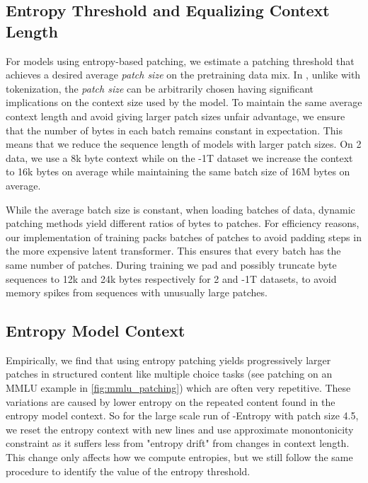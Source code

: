 \documentclass[]{fairmeta}
\begin{document}
\subsection{Entropy Threshold and Equalizing Context Length}
For models using entropy-based patching, we estimate a patching threshold that achieves a desired average \textit{patch size} on the pretraining data mix.  In \model{}, unlike with tokenization, the \textit{patch size} can be arbitrarily chosen having significant implications on the context size used by the model.
To maintain the same average context length and avoid giving larger patch sizes unfair advantage, we ensure that the number of bytes in each batch remains constant in expectation. This means that we reduce the sequence length of models with larger patch sizes. On \llama{} 2 data, we use a 8k byte context while on the \model{}-1T dataset we increase the context to 16k bytes on average while maintaining the same batch size of 16M bytes on average.

While the average batch size is constant, when loading batches of data, dynamic patching methods yield different ratios of bytes to patches.
For efficiency reasons, our implementation of \model{} training packs batches of patches to avoid padding steps in the more expensive latent transformer. This ensures that every batch has the same number of patches. During training we pad and possibly truncate byte sequences to 12k and 24k bytes respectively for \llama{} 2 and \model{}-1T datasets, to avoid memory spikes from sequences with unusually large patches.

\subsection{Entropy Model Context}
\label{section:entropy-context}
Empirically, we find that using entropy patching yields progressively larger patches in structured content like multiple choice tasks (see patching on an MMLU example in \autoref{fig:mmlu_patching}) which are often very repetitive. These variations are caused by lower entropy on the repeated content found in the entropy model context. So for the large scale run of \model{}-Entropy with patch size 4.5, we reset the entropy context with new lines and use approximate monontonicity constraint as it suffers less from "entropy drift" from changes in context length. This change only affects how we compute entropies, but we still follow the same procedure to identify the value of the entropy threshold.
\end{document}
